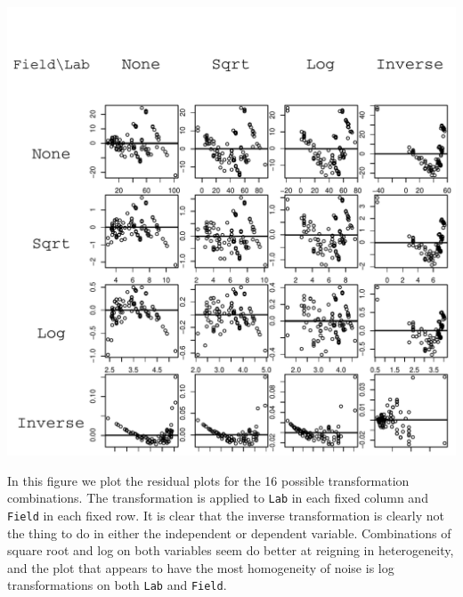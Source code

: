 \documentclass{homework}
\begin{document}
\begin{longproblem}
\vspace{-2em}
\begin{minipage}{.5\textwidth}
\includegraphics[width=\textwidth]{resid_matrix.pdf}
\end{minipage}
\begin{minipage}{.5\textwidth}
In this figure we plot the residual plots for the 16 possible transformation
combinations. The transformation is applied to \texttt{Lab} in each fixed
column and \texttt{Field} in each fixed row.  It is clear that the inverse
transformation is clearly not the thing to do in either the independent or
dependent variable.  Combinations of square root and log on both variables seem 
do better at reigning in heterogeneity, 
and the plot that appears to have the most homogeneity of
noise is log transformations on both \texttt{Lab} and \texttt{Field}.
\end{minipage}
\end{longproblem}
\end{document}
